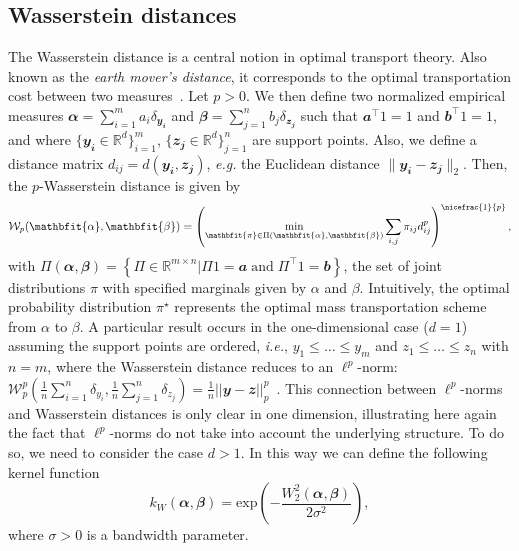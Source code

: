 \subsection*{Wasserstein distances}
The Wasserstein distance is a central notion in optimal transport theory. Also known as the \emph{earth mover's distance}, it corresponds to the optimal transportation cost between two measures~\cite{villani2008optimal,GabrielPeyre2019COTW}. Let $p>0$. We then define two normalized empirical measures $\mathbfit{\alpha} = \sum_{i=1}^m a_i \delta_{\mathbfit{y_i}}$ and $\mathbfit{\beta} = \sum_{j=1}^n b_j \delta_{\mathbfit{z_j}}$ such that $\mathbfit{a}^\top \mathbfit{1} = 1$ and $\mathbfit{b}^\top \mathbfit{1} = 1$, and where  $\{\mathbfit{y_i}\in \mathbb{R}^d\}_{i=1}^m$, $\{\mathbfit{z_j}\in \mathbb{R}^d\}_{j=1}^n$ are support points.
Also, we define a distance matrix $d_{ij} = d\left(\mathbfit{y_i},\mathbfit{z_j}\right)$, \emph{e.g.} the Euclidean distance $\|\mathbfit{y_i}-\mathbfit{z_j}\|_2$. Then, the $p$-Wasserstein distance is given by 
\begin{equation*}
\mathcal{W}_p(\mathbfit{\alpha},\mathbfit{\beta}) = \left(\min_{\mathbfit{\pi} \in \Pi\left(\mathbfit{\alpha},\mathbfit{\beta}\right)} \sum_{i,j} \pi_{ij}d_{ij}^p\right)^{\nicefrac{1}{p}},
\end{equation*}
 with $\Pi(\mathbfit{\alpha},\mathbfit{\beta}) = \left\{ \Pi \in \mathbb{R}^{m \times n} | \Pi \mathbfit{1}= \mathbfit{a} \; \mathrm{and} \; \Pi^\top \mathbfit{1}=\mathbfit{b} \right\}$, the set of joint distributions $\pi$ with specified marginals given by $\alpha$ and $\beta$. Intuitively, the optimal probability distribution $\pi^\star$ represents the optimal mass transportation scheme from $\alpha$ to $\beta$. A particular result occurs in the one-dimensional case ($d=1$) assuming the support points are ordered, \emph{i.e.}, $y_1 \leq \ldots \leq y_m$ and $z_1 \leq \ldots \leq z_n$ with $n=m$, where the Wasserstein distance reduces to an $\ell^p$-norm: $\mathcal{W}_p^p\left(\frac{1}{n} \sum_{i=1}^n\delta_{y_i}, \frac{1}{n}\sum_{j=1}^n \delta_{z_j}\right) = \tfrac{1}{n}||\mathbfit{y}-\mathbfit{z}||_p^p$~\cite{GabrielPeyre2019COTW}. This connection between $\ell^p$-norms and Wasserstein distances is only clear in one dimension, illustrating here again the fact that $\ell^p$-norms do not take into account the underlying structure. To do so, we need to consider the case $d>1$. In this way we can define the following kernel function 
 \begin{equation}
 k_W(\mathbfit{\alpha},\mathbfit{\beta}) = \mathrm{exp}\left(-\frac{W_2^2(\mathbfit{\alpha},\mathbfit{\beta})}{2\sigma^2}\right),\label{eq:kW}
 \end{equation}
where $\sigma > 0$ is a bandwidth parameter.

